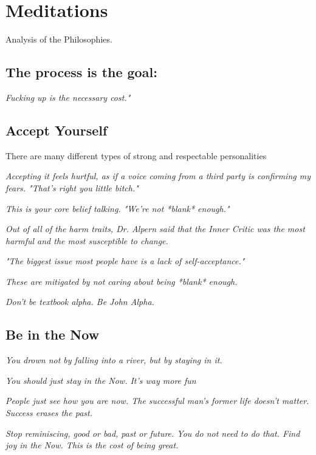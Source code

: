 \documentclass[12pt]{article}
\begin{document}
\pagebreak


\section*{Meditations}

Analysis of the Philosophies.  

\subsection*{The process is the goal:}
\textit{Fucking up is the necessary cost."}

\pagebreak

\subsection*{Accept Yourself}

There are many different types of strong and respectable personalities

\textit{Accepting it feels hurtful, as if a voice coming from a third party is confirming my fears.  "That's right you little bitch."}

\textit{This is your core belief talking.  "We're not *blank* enough."}

\textit{Out of all of the harm traits, Dr. Alpern said that the Inner Critic was the most harmful and the most susceptible to change.}

\textit{"The biggest issue most people have is a lack of self-acceptance."}

\textit{These are mitigated by not caring about being *blank* enough.}

\textit{Don't be textbook alpha.  Be John Alpha.}

\pagebreak




\subsection*{Be in the Now}

\textit{You drown not by falling into a river, but by staying in it.}

\textit{You should just stay in the Now.  It's way more fun}

\textit{People just see how you are now.  The successful man's former life doesn't matter.  Success erases the past.}

\textit{Stop reminiscing, good or bad, past or future.  You do not need to do that.  Find joy in the Now.  This is the cost of being great.}
\end{document}

